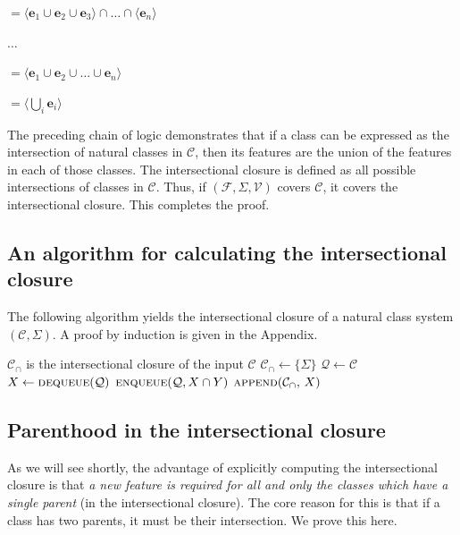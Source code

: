 \documentclass[11pt, oneside]{article}   	%
\begin{document}
\quad $ = \langle \mathbf{e}_1 \cup \mathbf{e}_2 \cup \mathbf{e}_3 \rangle \cap \ldots \cap \langle \mathbf{e}_n \rangle$

\quad $\ldots$

\quad $= \langle \mathbf{e}_1 \cup \mathbf{e}_2 \cup \ldots \cup \mathbf{e}_n \rangle$

\quad $= \langle \bigcup_i  \mathbf{e}_i \rangle$

\noindent The preceding chain of logic demonstrates that if a class can be expressed as the intersection of natural classes in $\mathcal C$, then its features are the union of the features in each of those classes. The intersectional closure is defined as all possible intersections of classes in $\mathcal C$. Thus, if $(\mathcal F, \Sigma, \mathcal V)$ covers $\mathcal C$, it covers the intersectional closure. This completes the proof.

\subsection{An algorithm for calculating the intersectional closure}

The following algorithm yields the intersectional closure of a natural class system $(\mathcal C, \Sigma)$. A proof by induction is given in the Appendix.

\noindent \begin{algorithmic}
    \ENSURE $\mathcal C_\cap$ is the intersectional closure of the input $\mathcal C$
    \STATE
    \STATE $\mathcal C_\cap \leftarrow \{ \Sigma \} $
    \STATE $\mathcal Q \leftarrow \mathcal C$
    \STATE
        \STATE $X \leftarrow \textsc{dequeue}(\mathcal Q)$
                \STATE $\textsc{enqueue}(\mathcal Q, X \cap Y)$
            \ENDFOR
            \STATE $\textsc{append}(\mathcal C_\cap, \, X)$
        \ENDIF
    \ENDWHILE
\end{algorithmic}

\subsection{Parenthood in the intersectional closure}

As we will see shortly, the advantage of explicitly computing the intersectional closure is that \textit{a new feature is required for all and only the classes which have a single parent} (in the intersectional closure). The core reason for this is that if a class has two parents, it must be their intersection. We prove this here.
\end{document}
